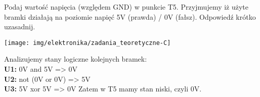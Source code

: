 % 
% 
% 
% 



%
%

\dbEntryCheckResults
Podaj wartość napięcia (względem GND) w punkcie T5. Przyjmujemy iż użyte bramki działają na poziomie napięć 5V (prawda) / 0V (fałsz). Odpowiedź krótko uzasadnij.
	\begin{center}
		\texttt{[image: img/elektronika/zadania\_teoretyczne-C]}
	\end{center}
\fi
{}\dbEntryCheckResults
Analizujemy stany logiczne kolejnych bramek:\\
	\textbf{U1:} 0V and 5V => 0V\\
	\textbf{U2:} not (0V or 0V) => 5V\\
	\textbf{U3:} 5V xor 5V => 0V
Zatem w T5 mamy stan niski, czyli 0V.
\fi

